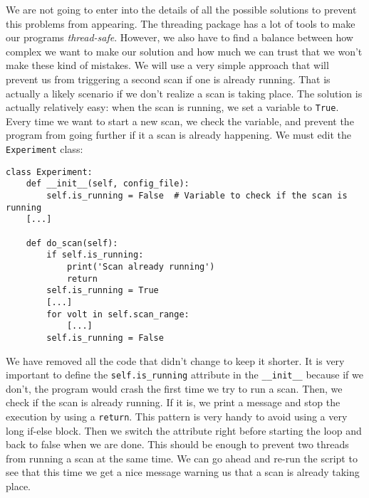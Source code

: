 We are not going to enter into the details of all the possible solutions to prevent this problems from appearing. The threading package has a lot of tools to make our programs \emph{thread-safe}. However, we also have to find a balance between how complex we want to make our solution and how much we can trust that we won't make these kind of mistakes. We will use a very simple approach that will prevent us from triggering a second scan if one is already running. That is actually a likely scenario if we don't realize a scan is taking place. The solution is actually relatively easy: when the scan is running, we set a variable to \texttt{True}. Every time we want to start a new scan, we check the variable, and prevent the program from going further if it a scan is already happening. We must edit the \texttt{Experiment} class:

\begin{verbatim}
class Experiment:
    def __init__(self, config_file):
        self.is_running = False  # Variable to check if the scan is running
    [...]

    def do_scan(self):
        if self.is_running:
            print('Scan already running')
            return
        self.is_running = True
        [...]
        for volt in self.scan_range:
            [...]
        self.is_running = False
\end{verbatim}

We have removed all the code that didn't change to keep it shorter. It is very important to define the \texttt{self.is\_running} attribute in the \texttt{\_\_init\_\_} because if we don't, the program would crash the first time we try to run a scan. Then, we check if the scan is already running. If it is, we print a message and stop the execution by using a \texttt{return}. This pattern is very handy to avoid using a very long if-else block. Then we switch the attribute right before starting the loop and back to false when we are done. This should be enough to prevent two threads from running a scan at the same time. We can go ahead and re-run the script to see that this time we get a nice message warning us that a scan is already taking place.


